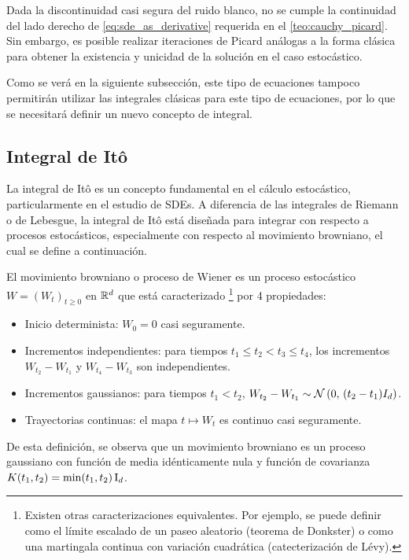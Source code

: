 Dada la discontinuidad casi segura del ruido blanco, no se cumple la continuidad del lado derecho de \eqref{eq:sde_as_derivative} requerida en el \autoref{teo:cauchy_picard}. Sin embargo, es posible realizar iteraciones de Picard análogas a la forma clásica para obtener la existencia y unicidad de la solución en el caso estocástico.

Como se verá en la siguiente subsección, este tipo de ecuaciones tampoco permitirán utilizar las integrales clásicas para este tipo de ecuaciones, por lo que se necesitará definir un nuevo concepto de integral.

\subsection{Integral de Itô}
La integral de Itô es un concepto fundamental en el cálculo estocástico, particularmente en el estudio de SDEs. A diferencia de las integrales de Riemann o de Lebesgue, la integral de Itô está diseñada para integrar con respecto a procesos estocásticos, especialmente con respecto al movimiento browniano, el cual se define a continuación.

\begin{defn}
    \label{defn:brownian_motion}
    El movimiento browniano o proceso de Wiener es un proceso estocástico $W=(W_t)_{t\geq0}$ en $\mathbb{R}^d$ que está caracterizado \footnote{Existen otras caracterizaciones equivalentes. Por ejemplo, se puede definir como el límite escalado de un paseo aleatorio (teorema de Donkster) o como una martingala continua con variación cuadrática (catecterización de Lévy).} por 4 propiedades:
    \begin{itemize}
        \item Inicio determinista: $W_0 = 0$ casi seguramente.
        \item Incrementos independientes: para tiempos $t_1\leq t_2<t_3\leq t_4$, los incrementos $W_{t_2} - W_{t_1}$ y $W_{t_4} - W_{t_3}$ son independientes.
        \item Incrementos gaussianos: para tiempos $t_1<t_2$, $W_{t_2} - W_{t_1}\sim\mathcal{N}\left(0,\,(t_2 - t_1)I_d\right)$.
        \item Trayectorias continuas: el mapa $t\mapsto W_t$ es continuo casi seguramente.
    \end{itemize}
\end{defn}

De esta definición, se observa que un movimiento browniano es un proceso gaussiano con función de media idénticamente nula y función de covarianza $K(t_1, t_2) = \min(t_1, t_2)\operatorname{I}_{d}$.

